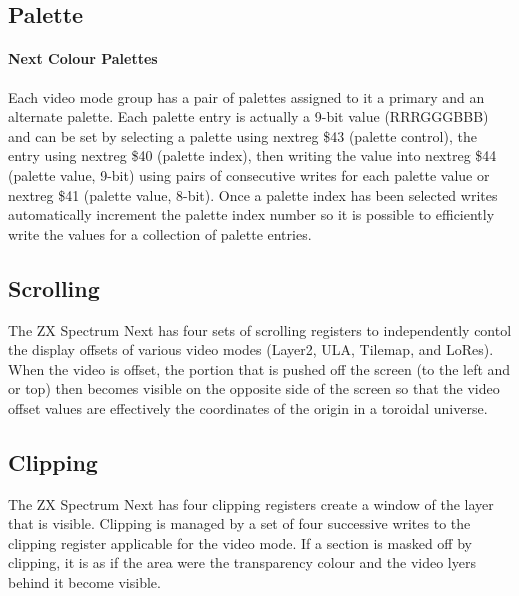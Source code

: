 




\subsection{Palette}
\paragraph{Next Colour Palettes}
Each video mode group has a pair of palettes assigned to it a primary
and an alternate palette. Each palette entry is actually a 9-bit value
(RRRGGGBBB) and can be set by selecting a palette using nextreg \$43
(palette control), the entry using nextreg \$40 (palette index), then
writing the value into nextreg \$44 (palette value, 9-bit) using pairs
of consecutive writes for each palette value or nextreg \$41 (palette
value, 8-bit). Once a palette index has been selected writes
automatically increment the palette index number so it is possible to
efficiently write the values for a collection of palette entries.






\subsection{Scrolling}
The ZX Spectrum Next has four sets of scrolling registers to
independently contol the display offsets of various video modes
(Layer2, ULA, Tilemap, and LoRes). When the video is offset, the
portion that is pushed off the screen (to the left and or top) then
becomes visible on the opposite side of the screen so that the video
offset values are effectively the coordinates of the origin in a
toroidal universe.

\subsection{Clipping}
The ZX Spectrum Next has four clipping registers create a window of
the layer that is visible. Clipping is managed by a set of four
successive writes to the clipping register applicable for the video
mode. If a section is masked off by clipping, it is as if the area
were the transparency colour and the video lyers behind it become
visible.
